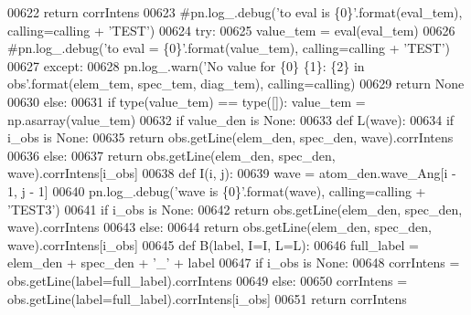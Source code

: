 \begin{DoxyCode}
{{{{00622                 \textcolor{keywordflow}{return} corrIntens
00623             \textcolor{comment}{#pn.log\_.debug('to eval is \{0\}'.format(eval\_tem), calling=calling + 'TEST')}
00624             \textcolor{keywordflow}{try}:
00625                 value\_tem = eval(eval\_tem)
00626                 \textcolor{comment}{#pn.log\_.debug('to eval = \{0\}'.format(value\_tem), calling=calling + 'TEST')}
00627             \textcolor{keywordflow}{except}:
00628                 pn.log\_.warn(\textcolor{stringliteral}{'No value for \{0\} \{1\}: \{2\} in obs'}.format(elem\_tem, spec\_tem, diag\_tem), 
      calling=calling)
00629                 \textcolor{keywordflow}{return} \textcolor{keywordtype}{None}
00630         \textcolor{keywordflow}{else}:
00631             \textcolor{keywordflow}{if} type(value\_tem) == type([]): value\_tem = np.asarray(value\_tem)
00632         \textcolor{keywordflow}{if} value\_den \textcolor{keywordflow}{is} \textcolor{keywordtype}{None}:
00633             \textcolor{keyword}{def }L(wave): 
00634                 \textcolor{keywordflow}{if} i\_obs \textcolor{keywordflow}{is} \textcolor{keywordtype}{None}:
00635                     \textcolor{keywordflow}{return} obs.getLine(elem\_den, spec\_den, wave).corrIntens
00636                 \textcolor{keywordflow}{else}:
00637                     \textcolor{keywordflow}{return} obs.getLine(elem\_den, spec\_den, wave).corrIntens[i\_obs]
00638             \textcolor{keyword}{def }I(i, j):
00639                 wave = atom\_den.wave\_Ang[i - 1, j - 1]
00640                 pn.log\_.debug(\textcolor{stringliteral}{'wave is \{0\}'}.format(wave), calling=calling + \textcolor{stringliteral}{'TEST3'})
00641                 \textcolor{keywordflow}{if} i\_obs \textcolor{keywordflow}{is} \textcolor{keywordtype}{None}:
00642                     \textcolor{keywordflow}{return} obs.getLine(elem\_den, spec\_den, wave).corrIntens
00643                 \textcolor{keywordflow}{else}:
00644                     \textcolor{keywordflow}{return} obs.getLine(elem\_den, spec\_den, wave).corrIntens[i\_obs]
00645             \textcolor{keyword}{def }B(label, I=I, L=L):
00646                 full\_label = elem\_den + spec\_den + \textcolor{stringliteral}{'\_'} + label
00647                 \textcolor{keywordflow}{if} i\_obs \textcolor{keywordflow}{is} \textcolor{keywordtype}{None}:
00648                     corrIntens = obs.getLine(label=full\_label).corrIntens
00649                 \textcolor{keywordflow}{else}:
00650                     corrIntens = obs.getLine(label=full\_label).corrIntens[i\_obs]
00651                 \textcolor{keywordflow}{return} corrIntens
}}}}
\end{DoxyCode}
